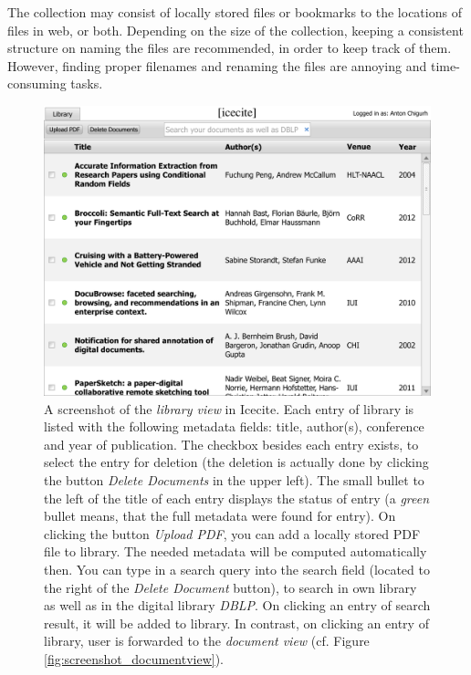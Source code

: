 The collection may consist of locally stored files or bookmarks to the locations of files in web, or both. Depending on the size of the collection, keeping a consistent structure on naming the files are recommended, in order to keep track of them. However, finding proper filenames and renaming the files are annoying and time-consuming tasks. 

\begin{figure}[!ht]
  \includegraphics[width=\textwidth]{./figures/libraryview}
  \caption{A screenshot of the \textit{library view} in Icecite. Each entry of library is listed with the following metadata fields: title, author(s), conference and year of publication. The checkbox besides each entry exists, to select the entry for deletion (the deletion is actually done by clicking the button \textit{Delete Documents} in the upper left).  The small bullet to the left of the title of each entry displays the status of entry (a \textit{green} bullet means, that the full metadata were found for entry). On clicking the button \textit{Upload PDF}, you can add a locally stored PDF file to library. The needed metadata will be computed automatically then. You can type in a search query into the search field (located to the right of the \textit{Delete Document} button), to search in own library as well as in the digital library \textit{DBLP}. On clicking an entry of search result, it will be added to library. In contrast, on clicking an entry of library, user is forwarded to the \textit{document view} (cf. Figure \ref{fig:screenshot_documentview}).}
  \label{fig:screenshot_libraryview}
\end{figure}

